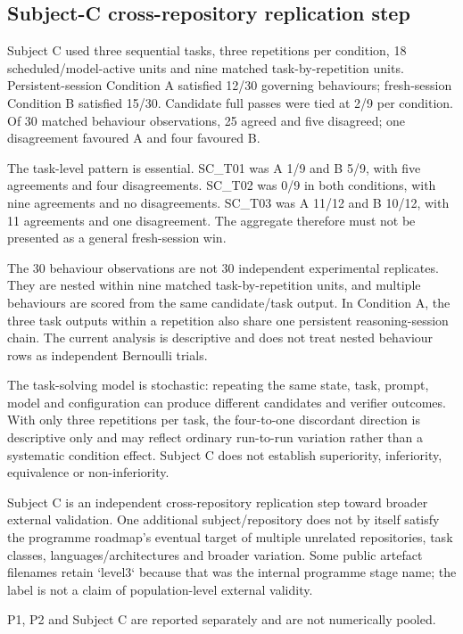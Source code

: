 \subsection{Subject-C cross-repository replication step}

Subject C used three sequential tasks, three repetitions per condition, 18 scheduled/model-active units and nine matched task-by-repetition units. Persistent-session Condition A satisfied 12/30 governing behaviours; fresh-session Condition B satisfied 15/30. Candidate full passes were tied at 2/9 per condition. Of 30 matched behaviour observations, 25 agreed and five disagreed; one disagreement favoured A and four favoured B.

The task-level pattern is essential. SC\_T01 was A 1/9 and B 5/9, with five agreements and four disagreements. SC\_T02 was 0/9 in both conditions, with nine agreements and no disagreements. SC\_T03 was A 11/12 and B 10/12, with 11 agreements and one disagreement. The aggregate therefore must not be presented as a general fresh-session win.

The 30 behaviour observations are not 30 independent experimental replicates. They are nested within nine matched task-by-repetition units, and multiple behaviours are scored from the same candidate/task output. In Condition A, the three task outputs within a repetition also share one persistent reasoning-session chain. The current analysis is descriptive and does not treat nested behaviour rows as independent Bernoulli trials.

The task-solving model is stochastic: repeating the same state, task, prompt, model and configuration can produce different candidates and verifier outcomes. With only three repetitions per task, the four-to-one discordant direction is descriptive only and may reflect ordinary run-to-run variation rather than a systematic condition effect. Subject C does not establish superiority, inferiority, equivalence or non-inferiority.

Subject C is an independent cross-repository replication step toward broader external validation. One additional subject/repository does not by itself satisfy the programme roadmap's eventual target of multiple unrelated repositories, task classes, languages/architectures and broader variation. Some public artefact filenames retain `level3` because that was the internal programme stage name; the label is not a claim of population-level external validity.

P1, P2 and Subject C are reported separately and are not numerically pooled.

